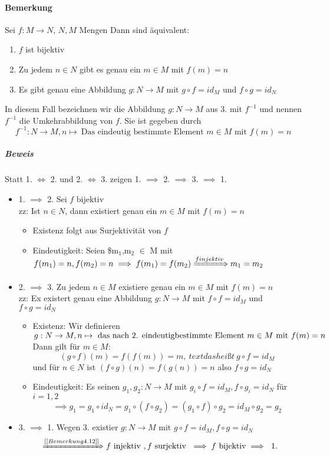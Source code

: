 \documentclass[a4paper]{scrartcl}
\theoremstyle{definition}
\theoremstyle{plain}
\theoremstyle{plain}
\theoremstyle{remark}
\theoremstyle{remark}
\theoremstyle{remark}
\theoremstyle{remark}
\theoremstyle{remark}
\begin{document}
\paragraph{Bemerkung}
\label{sec-2-6-7-6}
Sei $f:M\to N$, $N,M$ Mengen
Dann sind äquivalent:
\begin{enumerate}
\item $f$ ist bijektiv
\item Zu jedem $n\in N$ gibt es genau ein $m\in M$ mit $f(m) = n$
\item Es gibt genau eine Abbildung $g:N\to M$ mit $g\circ f = id_M$ und $f\circ g = id_N$
\end{enumerate}
In diesem Fall bezeichnen wir die Abbildung $g:N\to M$ aus 3. mit $f^{-1}$ und nennen $f^{-1}$ die Umkehrabbildung von $f$. Sie ist gegeben durch
\[f^{-1} : N\to M, n\mapsto~\text{Das eindeutig bestimmte Element $m\in M$ mit $f(m) = n$}\]
\subparagraph{Beweis}
\label{sec-2-6-7-6-1}
Statt 1. $\iff$ 2. und 2. $\iff$ 3. zeigen 1. $\implies$ 2. $\implies$ 3. $\implies$ 1.
\begin{itemize}
\item 1. $\implies$ 2. Sei $f$ bijektiv \\
        zz: Ist $n\in N$, dann existiert genau ein $m\in M$ mit $f(m) = n$ \\
\begin{itemize}
\item Existenz folgt aus Surjektivität von $f$
\item Eindeutigkeit: Seien \$m$_{\text{1}}$,m$_{\text{2}}$ $\in$ M  mit \(f(m_1) = n, f(m_2) = n \implies f(m_1) = f(m_2) \xRightarrow{f injektiv} m_1 = m_2\)
\end{itemize}
\item 2. $\implies$ 3. Zu jedem $n\in M$ existiere genau ein $m\in M$ mit $f(m) = n$ \\
        zz: Ex existert genau eine Abbildung $g:N\to M$ mit $f\circ f = id_M$ und $f\circ g = id_N$
\begin{itemize}
\item Existenz: Wir definieren \(g:N\to M, n\mapsto~\text{das nach 2. eindeutig \\
		  bestimmte Element $m\in M$ mit $f(m) = n$}\) \\
Dann gilt für $m\in M$: \[(g\circ f)(m) = f(f(m)) = m,~text{das heißt}~ g\circ f = id_M\]
und für $n\in N$ ist $(f\circ g)(n) = f(g(n)) = n$ also $f\circ g = id_N$
\item Eindeutigkeit: Es seinen $g_1,g_2:N\to M$ mit $g_i \circ f = id_M, f\circ g_i = id_N$ für $i = 1,2$ \\
          \[\implies g_1 = g_1 \circ id_N = g_1 \circ (f\circ g_2) = (g_1 \circ f) \circ g_2 = id_M \circ g_2 = g_2\]
\end{itemize}
\item 3. $\implies$ 1. Wegen 3. existier $g:N\to M$ mit $g\circ f = id_M,f\circ g = id_N$ \\
        \[\xRightarrow{[[Bemerkung 4.12]]} f~\text{injektiv}~,f~\text{surjektiv}~\implies f~\text{bijektiv}\implies~\text{1.}\]
\end{itemize}
\end{document}
